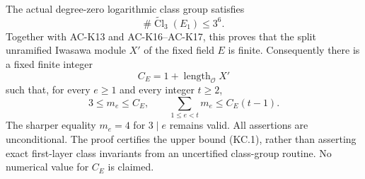 \begin{theorem}
\label{AC-K15}
The actual degree-zero logarithmic class group satisfies
\[
       \#\widetilde{\operatorname{Cl}}_3(E_1)\leq3^6.    \tag{KC.1}
\]
Together with AC-K13 and AC-K16--AC-K17, this proves that the
split unramified Iwasawa module $X'$ of the fixed field $E$ is
finite.  Consequently there is a fixed finite integer
\[
 C_E=1+\operatorname{length}_{\mathcal O}X'
\]
such that, for every $e\geq1$ and every integer $t\geq2$,
\[
 3\leq m_e\leq C_E,\qquad
 \sum_{1\leq e<t}m_e\leq C_E(t-1).                   \tag{KC.2}
\]
The sharper equality $m_e=4$ for $3\mid e$ remains valid.
All assertions are unconditional.  The proof certifies the
upper bound (KC.1), rather than asserting exact first-layer
class invariants from an uncertified class-group routine.
No numerical value for $C_E$ is claimed.
\end{theorem}
